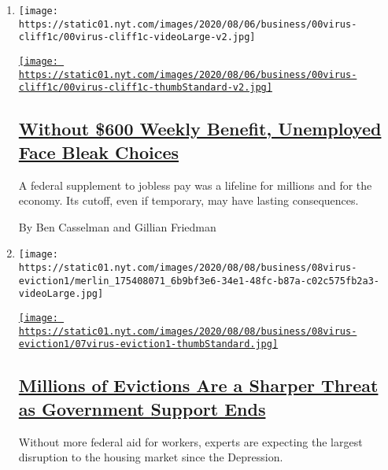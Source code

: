 \begin{enumerate}
\def\labelenumi{\arabic{enumi}.}
\item
  \texttt{[image: https://static01.nyt.com/images/2020/08/06/business/00virus-cliff1c/00virus-cliff1c-videoLarge-v2.jpg]}

  \href{/2020/08/08/business/economy/lost-unemployment-benefits.html}{\texttt{[image: https://static01.nyt.com/images/2020/08/06/business/00virus-cliff1c/00virus-cliff1c-thumbStandard-v2.jpg]}}

  \hypertarget{without-600-weekly-benefit-unemployed-face-bleak-choices}{%
  \subsection{\texorpdfstring{\href{/2020/08/08/business/economy/lost-unemployment-benefits.html}{Without
  \$600 Weekly Benefit, Unemployed Face Bleak
  Choices}}{Without \$600 Weekly Benefit, Unemployed Face Bleak Choices}}\label{without-600-weekly-benefit-unemployed-face-bleak-choices}}

  A federal supplement to jobless pay was a lifeline for millions and
  for the economy. Its cutoff, even if temporary, may have lasting
  consequences.

  By Ben Casselman and Gillian Friedman
\item
  \texttt{[image: https://static01.nyt.com/images/2020/08/08/business/08virus-eviction1/merlin\_175408071\_6b9bf3e6-34e1-48fc-b87a-c02c575fb2a3-videoLarge.jpg]}

  \href{/2020/08/07/business/economy/housing-economy-eviction-renters.html}{\texttt{[image: https://static01.nyt.com/images/2020/08/08/business/08virus-eviction1/07virus-eviction1-thumbStandard.jpg]}}

  \hypertarget{millions-of-evictions-are-a-sharper-threat-as-government-support-ends}{%
  \subsection{\texorpdfstring{\href{/2020/08/07/business/economy/housing-economy-eviction-renters.html}{Millions
  of Evictions Are a Sharper Threat as Government Support
  Ends}}{Millions of Evictions Are a Sharper Threat as Government Support Ends}}\label{millions-of-evictions-are-a-sharper-threat-as-government-support-ends}}

  Without more federal aid for workers, experts are expecting the
  largest disruption to the housing market since the Depression.


\end{enumerate}
